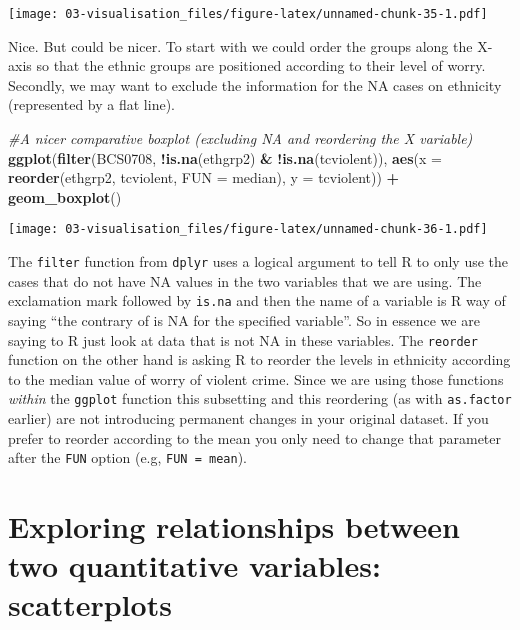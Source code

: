 \documentclass[
]{book}
\newenvironment{Shaded}{\begin{snugshade}}{\end{snugshade}}
\newcommand{\AttributeTok}[1]{\textcolor[rgb]{0.13,0.29,0.53}{#1}}
\newcommand{\CommentTok}[1]{\textcolor[rgb]{0.56,0.35,0.01}{\textit{#1}}}
\newcommand{\FunctionTok}[1]{\textcolor[rgb]{0.13,0.29,0.53}{\textbf{#1}}}
\newcommand{\NormalTok}[1]{#1}
\newcommand{\SpecialCharTok}[1]{\textcolor[rgb]{0.81,0.36,0.00}{\textbf{#1}}}
\begin{document}
\texttt{[image: 03-visualisation\_files/figure-latex/unnamed-chunk-35-1.pdf]}

Nice. But could be nicer. To start with we could order the groups along the X-axis so that the ethnic groups are positioned according to their level of worry. Secondly, we may want to exclude the information for the NA cases on ethnicity (represented by a flat line).

\begin{Shaded}
\begin{Highlighting}[]
\CommentTok{\#A nicer comparative boxplot (excluding NA and reordering the X variable)}
\FunctionTok{ggplot}\NormalTok{(}\FunctionTok{filter}\NormalTok{(BCS0708, }\SpecialCharTok{!}\FunctionTok{is.na}\NormalTok{(ethgrp2) }\SpecialCharTok{\&} \SpecialCharTok{!}\FunctionTok{is.na}\NormalTok{(tcviolent)), }
       \FunctionTok{aes}\NormalTok{(}\AttributeTok{x =} \FunctionTok{reorder}\NormalTok{(ethgrp2, tcviolent, }\AttributeTok{FUN =}\NormalTok{ median), }\AttributeTok{y =}\NormalTok{ tcviolent)) }\SpecialCharTok{+}
        \FunctionTok{geom\_boxplot}\NormalTok{()}
\end{Highlighting}
\end{Shaded}

\texttt{[image: 03-visualisation\_files/figure-latex/unnamed-chunk-36-1.pdf]}

The \texttt{filter} function from \texttt{dplyr} uses a logical argument to tell R to only use the cases that do not have NA values in the two variables that we are using. The exclamation mark followed by \texttt{is.na} and then the name of a variable is R way of saying ``the contrary of is NA for the specified variable''. So in essence we are saying to R just look at data that is not NA in these variables. The \texttt{reorder} function on the other hand is asking R to reorder the levels in ethnicity according to the median value of worry of violent crime. Since we are using those functions \emph{within} the \texttt{ggplot} function this subsetting and this reordering (as with \texttt{as.factor} earlier) are not introducing permanent changes in your original dataset. If you prefer to reorder according to the mean you only need to change that parameter after the \texttt{FUN} option (e.g, \texttt{FUN\ =\ mean}).

\section{Exploring relationships between two quantitative variables: scatterplots}\label{exploring-relationships-between-two-quantitative-variables-scatterplots}
\end{document}
